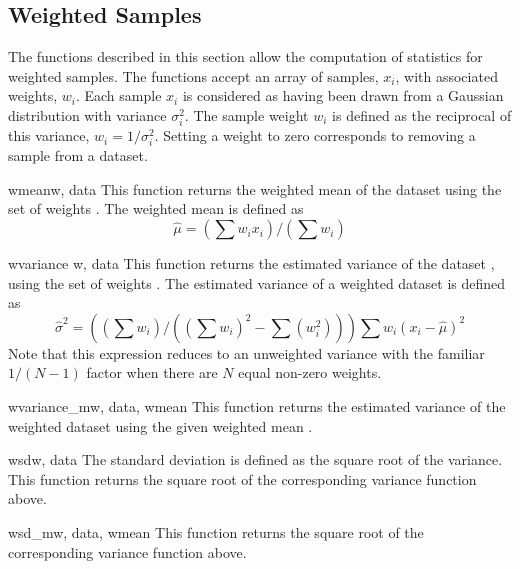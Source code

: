 \subsection{Weighted Samples}
\label{sec:weighted-samples}

The functions described in this section allow the computation of statistics for
weighted samples.  The functions accept an array of samples, $x_i$, with
associated weights, $w_i$.  Each sample $x_i$ is considered as having been
drawn from a Gaussian distribution with variance $\sigma_i^2$.  The sample
weight $w_i$ is defined as the reciprocal of this variance, $w_i =
1/\sigma_i^2$.  Setting a weight to zero corresponds to removing a sample from
a dataset.

\begin{funcdesc}{wmean}{w, data}
   This function returns the weighted mean of the dataset  using the
   set of weights .  The weighted mean is defined as
   \begin{equation}
      \hat\mu = (\sum w_i x_i) / (\sum w_i)
   \end{equation}
\end{funcdesc}

\begin{funcdesc}{wvariance }{w, data}
   This function returns the estimated variance of the dataset ,
   using the set of weights .  The estimated variance of a weighted
   dataset is defined as
   \begin{equation}
      \hat\sigma^2 = ((\sum w_i)/((\sum w_i)^2 - \sum (w_i^2))) \sum w_i (x_i - \hat\mu)^2
   \end{equation}
   Note that this expression reduces to an unweighted variance with the
   familiar $1/(N-1)$ factor when there are $N$ equal non-zero weights.
\end{funcdesc}

\begin{funcdesc}{wvariance_m}{w, data, wmean}
   This function returns the estimated variance of the weighted dataset
    using the given weighted mean .
\end{funcdesc}

\begin{funcdesc}{wsd}{w, data}
   The standard deviation is defined as the square root of the variance.  This
   function returns the square root of the corresponding variance function
    above.
\end{funcdesc}

\begin{funcdesc}{wsd_m}{w, data, wmean}
   This function returns the square root of the corresponding variance function
    above.
\end{funcdesc}

